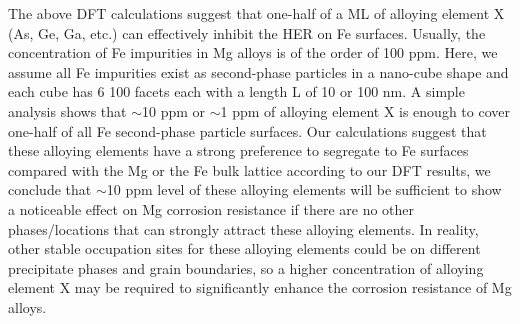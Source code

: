 The above DFT calculations suggest that one-half of a \ac{ML} of alloying element X (As, Ge, Ga, etc.) can effectively inhibit the HER on Fe surfaces. Usually, the concentration of Fe impurities in Mg alloys is of the order of 100 ppm. Here, we assume all Fe impurities exist as second-phase particles in a nano-cube shape and each cube has 6 {100} facets each with a length L of 10 or 100 nm. A simple analysis shows that $\sim$10 ppm or $\sim$1 ppm of alloying element X is enough to cover one-half of all Fe second-phase particle surfaces. Our calculations suggest that these alloying elements have a strong preference to segregate to Fe surfaces compared with the Mg or the Fe bulk lattice according to our DFT results, we conclude that $\sim$10 ppm level of these alloying elements will be sufficient to show a noticeable effect on Mg corrosion resistance if there are no other phases/locations that can strongly attract these alloying elements. In reality, other stable occupation sites for these alloying elements could be on different precipitate phases and grain boundaries, so a higher concentration of alloying element X may be required to significantly enhance the corrosion resistance of Mg alloys.
